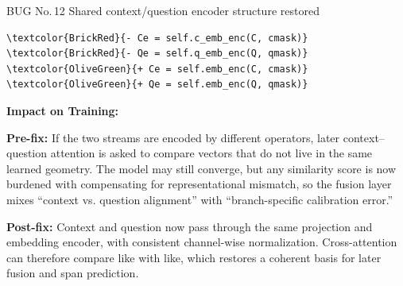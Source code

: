 \documentclass[10pt]{article}
\newcommand{\FieldLabel}[1]{%
 {\bfseries #1:}\par
}
\begin{document}
\begin{bugbox}{BUG No.\,12 \quad Shared context/question encoder structure restored}
\begin{Verbatim}[commandchars=\\\{\},fontsize=\footnotesize,breaklines=true,breaksymbol={},frame=leftline,framerule=2pt,rulecolor=\color{gray!40},xleftmargin=6pt,formatcom=\singlespacing]
\textcolor{BrickRed}{- Ce = self.c_emb_enc(C, cmask)}
\textcolor{BrickRed}{- Qe = self.q_emb_enc(Q, qmask)}
\textcolor{OliveGreen}{+ Ce = self.emb_enc(C, cmask)}
\textcolor{OliveGreen}{+ Qe = self.emb_enc(Q, qmask)}
\end{Verbatim}
\vspace{0.22em}
\FieldLabel{Impact on Training}
\textbf{Pre-fix:} If the two streams are encoded by different operators, later context--question attention is asked to compare vectors that do not live in the same learned geometry. The model may still converge, but any similarity score is now burdened with compensating for representational mismatch, so the fusion layer mixes ``context vs. question alignment'' with ``branch-specific calibration error.''\par\smallskip
\textbf{Post-fix:} Context and question now pass through the same projection and embedding encoder, with consistent channel-wise normalization. Cross-attention can therefore compare like with like, which restores a coherent basis for later fusion and span prediction.
\par
\vspace{0.35em}
\end{bugbox}
\end{document}
